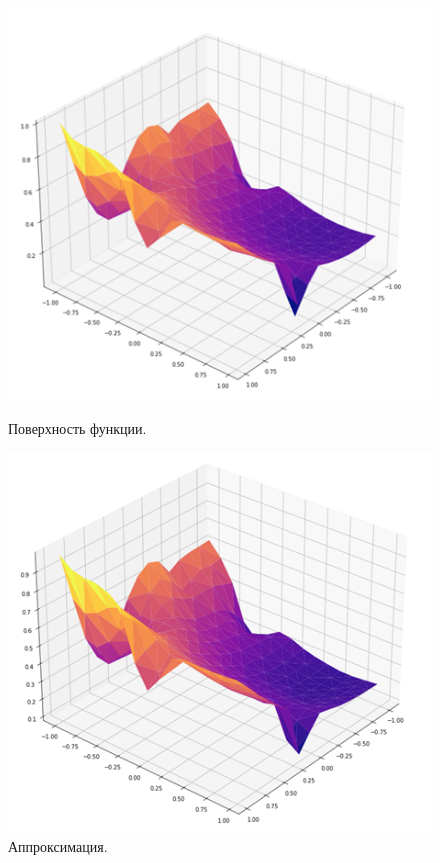 \documentclass[11pt, oneside, a4paper]{article}
\begin{document}
\begin{figure}[!h]
	\begin{center}
		\begin{minipage}[!h]{0.45\linewidth}
			\includegraphics[width=1\linewidth]{figure/1.png}
			\caption{Поверхность функции.} %
		\end{minipage}
		\hfill
		\begin{minipage}[!h]{0.45\linewidth}
			\includegraphics[width=1\linewidth]{figure/1_approx.png}
			\caption{Аппроксимация.}
		\end{minipage}
	\end{center}
\end{figure}	
\end{document}
